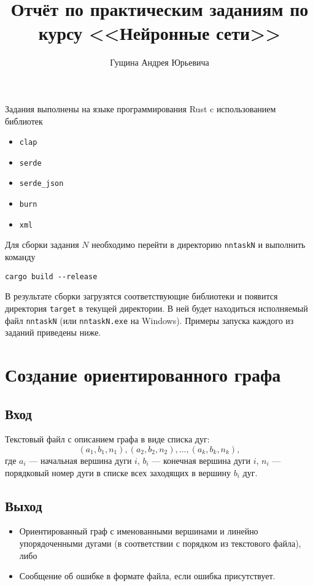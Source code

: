 \documentclass[spec, och, labwork]{SCWorks}
\title{Отчёт по практическим заданиям по курсу <<Нейронные сети>>}
\author{Гущина Андрея Юрьевича} %
\begin{document}

\tableofcontents

\intro

Задания выполнены на языке программирования Rust c использованием библиотек
\begin{itemize}
  \item \verb|clap|
  \item \verb|serde|
  \item \verb|serde_json|
  \item \verb|burn|
  \item \verb|xml|
\end{itemize}

Для сборки задания $N$ необходимо перейти в директорию \texttt{nntaskN} и
выполнить команду
\begin{verbatim}
cargo build --release
\end{verbatim}

В результате сборки загрузятся соответствующие библиотеки и появится директория
\verb|target| в текущей директории. В ней будет находиться исполняемый файл
\texttt{nntaskN} (или \texttt{nntaskN.exe} на Windows). Примеры запуска каждого
из заданий приведены ниже.

\section{Создание ориентированного графа}

\subsection*{Вход}

Текстовый файл с описанием графа в виде списка дуг:
\begin{equation*}
    (a_1, b_1, n_1), (a_2, b_2, n_2), \dots, (a_k, b_k, n_k),
\end{equation*}
где $a_i$ --- начальная вершина дуги $i$, $b_i$ --- конечная вершина дуги $i$,
$n_i$ --- порядковый номер дуги в списке всех заходящих в вершину $b_i$ дуг.

\subsection*{Выход}

\begin{itemize}
  \item
    Ориентированный граф с именованными вершинами и линейно упорядоченными
    дугами (в соответствии с порядком из текстового файла), либо
  \item Сообщение об ошибке в формате файла, если ошибка присутствует.
\end{itemize}
\end{document}
